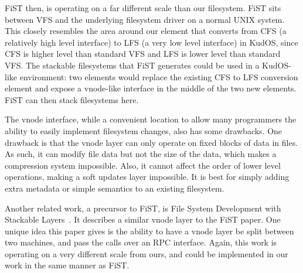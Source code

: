 FiST then, is operating on a far different scale than our filesystem.
FiST sits between VFS and the underlying filesystem driver on a normal
UNIX system. This closely resembles the area around our element that
converts from CFS (a relatively high level interface) to LFS (a very
low level interface) in KudOS, since CFS is higher level than standard
VFS and LFS is lower level than standard VFS. The stackable
filesystems that FiST generates could be used in a KudOS-like
environment: two elements would replace the existing CFS to LFS
conversion element and expose a vnode-like interface in the middle of
the two new elements. FiST can then stack filesystems here.

The vnode interface, while a convenient location to allow many
programmers the ability to easily implement filesystem changes, also
has some drawbacks. One drawback is that the vnode layer can only
operate on fixed blocks of data in files. As such, it can modify file
data but not the size of the data, which makes a compression system
impossible. Also, it cannot affect the order of lower level
operations, making a soft updates layer impossible. It is best for
simply adding extra metadata or simple semantics to an existing
filesystem.

Another related work, a precursor to FiST, is File System Development
with Stackable Layers~\cite{heidemann93stack}. It describes a similar
vnode layer to the FiST paper. One unique idea this paper gives is the
ability to have a vnode layer be split between two machines, and pass
the calls over an RPC interface. Again, this work is operating on a
very different scale from ours, and could be implemented in our work
in the same manner as FiST.
